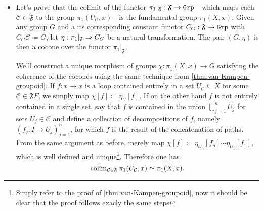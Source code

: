 \begin{itemize}\setlength\itemsep{0em}
    \item Let's prove that the colimit of the functor
          \(\pi_1|_{\mathfrak{F}}: \mathfrak{F} \to {\texttt{Grp}}\)---which maps each
          \(\mathcal{C} \in \mathfrak{F}\) to the group
          \(\pi_1(U_{\mathcal{C}}, x)\)---is the fundamental group \(\pi_1(X,
          x)\). Given any group \(G\) and a its corresponding constant functor
          \(C_G: \mathfrak{F} \to {\texttt{Grp}}\) with \(C_G \mathcal{C} \coloneq G\), let
          \(\eta: \pi_1|_{\mathfrak{F}} \Rightarrow C_G\) be a natural transformation. The pair
          \((G, \eta)\) is then a cocone over the functor \(\pi_1|_{\mathfrak F}\).

          We'll construct a unique morphism of groups \(\chi: \pi_1(X, x) \to G\)
          satisfying the coherence of the cocones using the same technique from
          \cref{thm:van-Kampen-groupoid}. If \(f: x \to x\) is a loop contained entirely
          in a set \(U_{\mathcal{C}} \subseteq X\) for some
          \(\mathcal{C} \in \mathfrak{F} F\), we simply map
          \(\chi [f] \coloneq \eta_{\mathcal{C}} [f]\). If on the other hand \(f\) is
          not entirely contained in a single set, say that \(f\) is contained in the
          union \(\bigcup_{j=1}^n U_j\) for sets \(U_j \in \mathcal{C}\) and define a
          collection of decompositions of \(f\), namely \((f_j: I \to U_j)_{j=1}^n\),
          for which \(f\) is the result of the concatenation of paths. From the same
          argument as before, merely map
          \(\chi [f] \coloneq \eta_{U_n} [f_n] \cdots \eta_{U_1} [f_1]\), which is well
          defined and unique\footnote{Simply refer to the proof of
              \cref{thm:van-Kampen-groupoid}, now it should be clear that the proof
              follows exacly the same steps}. Therefore one has
          \begin{equation}\label{eq:van-kampen-grp-2}
              \operatorname{colim}_{\mathcal{C} \in \mathfrak{F}} \pi_1(U_{\mathcal{C}}, x) \simeq \pi_1(X, x).
          \end{equation}


\end{itemize}
